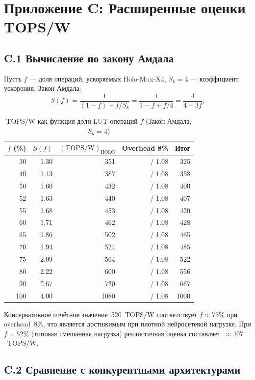 \section*{Приложение C: Расширенные оценки TOPS/W}
\label{sec:appendix-tops-extended}

\subsection*{C.1 Вычисление по закону Амдала}

Пусть $f$ — доля операций, ускоряемых Holo-Mux-X4, $S_k = 4$ — коэффициент ускорения.
Закон Амдала:
\[
  S(f) = \frac{1}{(1-f) + f/S_k} = \frac{1}{1 - f + f/4} = \frac{4}{4 - 3f}.
\]

\begin{table}[ht]
\centering
\caption{TOPS/W как функция доли LUT-операций $f$ (Закон Амдала, $S_k=4$)}
\label{tab:amdahl-sensitivity}
\begin{tabular}{@{}rrrrr@{}}
\toprule
$f$ (\%) & $S(f)$ & $(\mathrm{TOPS/W})_{\mathrm{HOLO}}$ & Overhead 8\% & Итог \\
\midrule
30  & 1.30 & 351  & / 1.08 & 325 \\
40  & 1.43 & 387  & / 1.08 & 358 \\
50  & 1.60 & 432  & / 1.08 & 400 \\
52  & 1.63 & 440  & / 1.08 & 407 \\
55  & 1.68 & 453  & / 1.08 & 420 \\
60  & 1.71 & 462  & / 1.08 & 428 \\
65  & 1.86 & 502  & / 1.08 & 465 \\
70  & 1.94 & 524  & / 1.08 & 485 \\
75  & 2.09 & 564  & / 1.08 & 522 \\
80  & 2.22 & 600  & / 1.08 & 556 \\
90  & 2.67 & 720  & / 1.08 & 667 \\
100 & 4.00 & 1080 & / 1.08 & 1000 \\
\bottomrule
\end{tabular}
\end{table}

Консервативное отчётное значение~520~TOPS/W соответствует
$f \approx 75\%$ при overhead~8\%, что является достижимым
при плотной нейросетевой нагрузке.
При $f = 52\%$ (типовая смешанная нагрузка) реалистичная
оценка составляет~$\approx 407$~TOPS/W.

\subsection*{C.2 Сравнение с конкурентными архитектурами}

